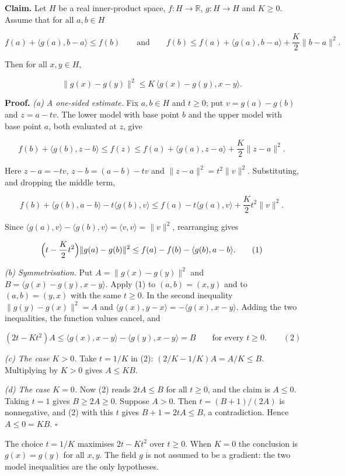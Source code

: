 \documentclass[11pt,a4paper]{article}
\begin{document}
\textbf{Claim.} Let \(H\) be a real inner-product space, \(f:H\to\mathbb R\), \(g:H\to H\) and \(K\ge0\). Assume that for all \(a,b\in H\)


\[f(a)+\langle g(a),b-a\rangle\le f(b)\qquad\text{and}\qquad f(b)\le f(a)+\langle g(a),b-a\rangle+\frac K2\|b-a\|^2.\]


Then for all \(x,y\in H\),


\[\|g(x)-g(y)\|^2\le K\,\langle g(x)-g(y),x-y\rangle.\]


\textbf{Proof.} \emph{(a) A one-sided estimate.} Fix \(a,b\in H\) and \(t\ge0\); put \(v=g(a)-g(b)\) and \(z=a-tv\). The lower model with base point \(b\) and the upper model with base point \(a\), both evaluated at \(z\), give


\[f(b)+\langle g(b),z-b\rangle\le f(z)\le f(a)+\langle g(a),z-a\rangle+\frac K2\|z-a\|^2.\]


Here \(z-a=-tv\), \(z-b=(a-b)-tv\) and \(\|z-a\|^2=t^2\|v\|^2\). Substituting, and dropping the middle term,


\[f(b)+\langle g(b),a-b\rangle-t\langle g(b),v\rangle\le f(a)-t\langle g(a),v\rangle+\frac K2t^2\|v\|^2.\]


Since \(\langle g(a),v\rangle-\langle g(b),v\rangle=\langle v,v\rangle=\|v\|^2\), rearranging gives


\[\Bigl(t-\frac K2t^2\Bigr)\|g(a)-g(b)\|^2\le f(a)-f(b)-\langle g(b),a-b\rangle.\qquad(1)\]


\emph{(b) Symmetrisation.} Put \(A=\|g(x)-g(y)\|^2\) and \(B=\langle g(x)-g(y),x-y\rangle\). Apply (1) to \((a,b)=(x,y)\) and to \((a,b)=(y,x)\) with the same \(t\ge0\). In the second inequality \(\|g(y)-g(x)\|^2=A\) and \(\langle g(x),y-x\rangle=-\langle g(x),x-y\rangle\). Adding the two inequalities, the function values cancel, and


\[(2t-Kt^2)A\le\langle g(x),x-y\rangle-\langle g(y),x-y\rangle=B\qquad\text{for every }t\ge0.\qquad(2)\]


\emph{(c) The case \(K>0\).} Take \(t=1/K\) in (2): \((2/K-1/K)A=A/K\le B\). Multiplying by \(K>0\) gives \(A\le KB\).




\emph{(d) The case \(K=0\).} Now (2) reads \(2tA\le B\) for all \(t\ge0\), and the claim is \(A\le0\). Taking \(t=1\) gives \(B\ge2A\ge0\). Suppose \(A>0\). Then \(t=(B+1)/(2A)\) is nonnegative, and (2) with this \(t\) gives \(B+1=2tA\le B\), a contradiction. Hence \(A\le0=K B\). \(\square\)




The choice \(t=1/K\) maximises \(2t-Kt^2\) over \(t\ge0\). When \(K=0\) the conclusion is \(g(x)=g(y)\) for all \(x,y\). The field \(g\) is not assumed to be a gradient: the two model inequalities are the only hypotheses.
\end{document}
